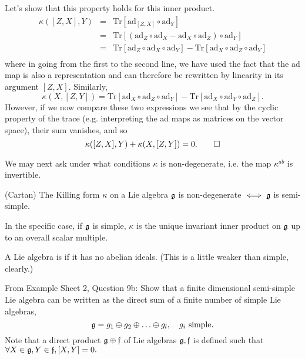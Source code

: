 Let's show that this property holds for this inner product.
\begin{eqnarray*}
\kappa([Z,X],Y) &=&\text{Tr}[\text{ad}_{[Z,X]}\circ \text{ad}_Y]\\
&=&\text{Tr}[(\text{ad}_Z \circ \text{ad}_X - \text{ad}_X \circ \text{ad}_Z)\circ \text{ad}_Y]\\
&=&\text{Tr}[\text{ad}_Z \circ \text{ad}_X \circ \text{ad}_Y] - \text{Tr}[\text{ad}_X \circ \text{ad}_Z \circ \text{ad}_Y]\\
\end{eqnarray*}
where in going from the first to the second line, we have used the fact that the ad map is also a representation and can therefore be rewritten by linearity in its argument $[Z,X]$.
Similarly,
$$\kappa(X,[Z,Y])=\text{Tr}[\text{ad}_X\circ \text{ad}_Z \circ \text{ad}_Y]-\text{Tr}[\text{ad}_X \circ \text{ad}_Y \circ \text{ad}_Z].$$
However, if we now compare these two expressions we see that by the cyclic property of the trace (e.g. interpreting the ad maps as matrices on the vector space), their sum vanishes, and so
$$\kappa([Z,X],Y)+\kappa(X,[Z,Y])=0. \qed$$

We may next ask under what conditions $\kappa$ is non-degenerate, i.e. the map $\kappa^{ab}$ is invertible. 
\begin{thm}
(Cartan) The Killing form $\kappa$ on a Lie algebra $\mathfrak{g}$ is non-degenerate $\iff \mathfrak{g}$ is semi-simple.
\end{thm}
In the specific case, if $\mathfrak{g}$ is simple, $\kappa$ is the unique invariant inner product on $\mathfrak{g}$ up to an overall scalar multiple.
\begin{defn}
A Lie algebra is  if it has no abelian ideals. (This is a little weaker than simple, clearly.)
\end{defn}
\begin{ex}
From Example Sheet 2, Question 9b: Show that a finite dimensional semi-simple Lie algebra can be written as the direct sum of a finite number of simple Lie algebras,
$$\mathfrak{g} = g_1\oplus g_2 \oplus \ldots \oplus g_l, \quad g_i\text{ simple}.$$
Note that a direct product $\mathfrak{g} \oplus \mathfrak{f}$ of Lie algebras $\mathfrak{g},\mathfrak{f}$ is defined such that $\forall X\in \mathfrak{g}, Y \in \mathfrak{f}, [X,Y]=0.$
\end{ex}

